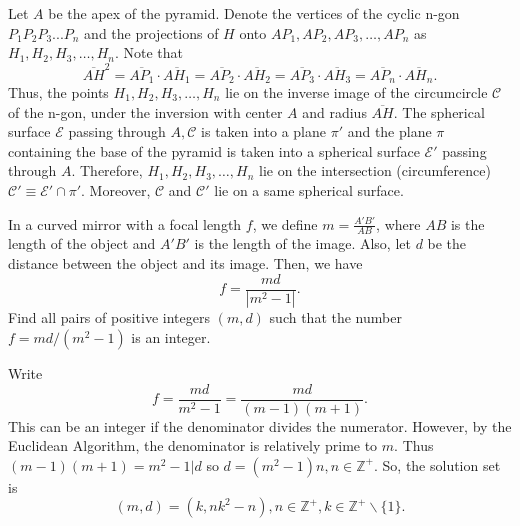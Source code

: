 \begin{solution}[name={Solution by Luis González}] 
	Let $A$ be the apex of the pyramid. Denote the vertices of the cyclic n-gon $P_1P_2P_3...P_n$ and the projections of $H$ onto $AP_1 , AP_2 , AP_3, \dots  ,AP_n$ as $H_1,H_2,H_3, \dots ,H_n$. Note that
	\[\overline{AH}^2=\overline{AP_1} \cdot \overline{AH_1}=\overline{AP_2} \cdot \overline{AH_2}=\overline{AP_3} \cdot \overline{AH_3}=\overline{AP_n} \cdot \overline{AH_n}.\]
	Thus, the points $H_1,H_2,H_3,\dots,H_n$ lie on the inverse image of the circumcircle $\mathcal{C}$ of the n-gon, under the inversion with center $A$ and radius $\overline{AH}.$ The spherical surface $\mathcal{E}$ passing through $A, \mathcal{C}$ is taken into a plane $\pi'$ and the plane $\pi$ containing the base of the pyramid is taken into a spherical surface $\mathcal{E}'$ passing through $A$. Therefore, $H_1,H_2,H_3,\dots,H_n$ lie on the intersection (circumference) $\mathcal{C}' \equiv \mathcal{E}' \cap \pi'.$ Moreover, $\mathcal{C}$ and $\mathcal{C}'$ lie on a same spherical surface.
\end{solution}





\begin{question}[name={Spherical Mirrors by Amir}]
	In a curved mirror with a focal length $f$, we define $m=\frac{A'B'}{AB}$, where $AB$ is the length of the object and $A'B'$ is the length of the image. Also, let $d$ be the distance between the object and its image. Then, we have $$f=\frac{md}{|m^2-1|}.$$ Find all pairs of positive integers $(m, d)$ such that the number $f=md/(m^2-1)$ is an integer.
\end{question}





\begin{solution}[name={Solution by JSGandora}] 
	Write $$f=\frac{md}{m^{2}-1}=\frac{md}{(m-1)(m+1)}.$$ This can be an integer if the denominator divides the numerator. However, by the Euclidean Algorithm, the denominator is relatively prime to $m$. Thus $(m-1)(m+1)=m^2-1|d$ so $d=(m^2-1)n, n\in\mathbb{Z^{+}}$. So, the solution set is \[(m,d)=(k, nk^2-n), n\in\mathbb{Z}^{+}, k\in\mathbb{Z}^{+}\backslash \{1\}.\]
\end{solution}






